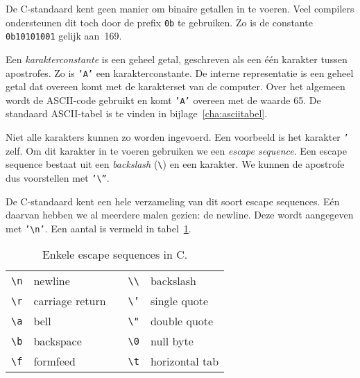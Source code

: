 De C-standaard kent geen manier om binaire getallen in te voeren. Veel compilers ondersteunen dit toch door de prefix \texttt{0b} te gebruiken. Zo is de constante \texttt{0b10101001} gelijk aan~169.

Een\textsl{ karakterconstante} is een geheel getal, geschreven als een één karakter tussen apostrofes. Zo is \texttt{'A'} een karakterconstante. De interne representatie is een geheel getal dat overeen komt met de karakterset van de computer. Over het algemeen wordt de ASCII-code gebruikt en komt \texttt{'A'} overeen met de waarde 65.
De standaard ASCII-tabel is te vinden in bijlage~\ref{cha:asciitabel}.

Niet alle karakters kunnen zo worden ingevoerd. Een voorbeeld is het karakter \texttt{'} zelf. Om dit karakter in te voeren gebruiken we een \textsl{escape sequence}. Een escape sequence bestaat uit een \textsl{backslash} (\texttt{\textbackslash}) en een karakter. We kunnen de apostrofe dus voorstellen met \texttt{'\textbackslash''}.

De C-standaard kent een hele verzameling van dit soort escape sequences. Eén daarvan hebben we al meerdere malen gezien: de newline. Deze wordt aangegeven met \texttt{'\textbackslash n'}. Een aantal is vermeld in tabel~\ref{tab:varescseq}.

\begin{table}[!ht]
\centering
\caption{Enkele escape sequences in C.}
\label{tab:varescseq}
\begin{tabular}{llp{1cm}ll}
\toprule
\texttt{\textbackslash n} & newline         &  & \texttt{\textbackslash\textbackslash}  & backslash \\
\texttt{\textbackslash r} & carriage return &  & \texttt{\textbackslash '} & single quote \\
\texttt{\textbackslash a} & bell            &  & \texttt{\textbackslash "} & double quote \\
\texttt{\textbackslash b} & backspace       &  & \texttt{\textbackslash 0} & null byte \\
\texttt{\textbackslash f} & formfeed        &  & \texttt{\textbackslash t} & horizontal tab \\
\bottomrule
\end{tabular}
\end{table}


